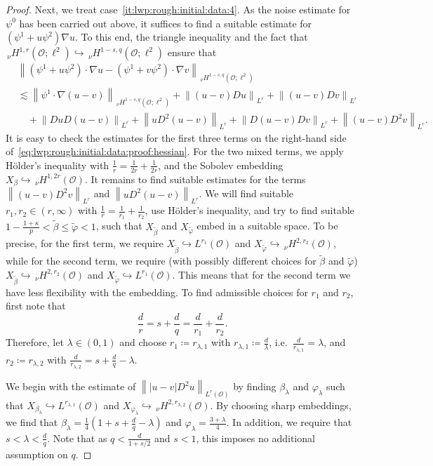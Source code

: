 \documentclass[reqno]{amsart}
\newcommand{\sO}{\mathscr{O}}
\newcommand{\ce}{\coloneqq}
\newcommand{\1}{\mathbf{1}}
\newcommand{\nH}{\ensuremath{\,_\nu H}}
\newcommand{\bpsn}[1]{\ensuremath{\nH^{#1}(\sO)}}
\newcommand{\Bpsn}[1]{\ensuremath{\nH^{#1}(\sO;\ell^2)}}
\newcommand{\nrm}[1]{\left\lVert #1 \right\rVert}
\begin{document}
\begin{proof}
        Next, we treat case~\ref{it:lwp:rough:initial:data:4}. As the noise estimate for $\psi^0$ has been carried out above, it suffices to find a suitable estimate for $(\psi^1+ u\psi^2)\nabla u$. 
        To this end, the triangle inequality and the fact that $\Bpsn{1,r}\hookrightarrow \Bpsn{1-s,q}$ ensure that \begin{equation}\label{eq:lwp:rough:initial:data:proof:hessian}        \begin{aligned}
            &\nrm{(\psi^1+ u\psi^2)\cdot\nabla u-(\psi^1+v\psi^2)\cdot\nabla v}_{\Bpsn{1-s,q}}\\
            &\lesssim \nrm{\psi^1\cdot\nabla(u-v)}_{\Bpsn{1-s,q}} +\nrm{(u-v)Du}_{L^r} +\nrm{(u-v) Dv}_{L^r} \\
            &\quad + \nrm{Du D(u-v)}_{L^r} +\nrm{u D^2(u-v)}_{L^r}+ \nrm{D(u-v)Dv}_{L^r} +\nrm{(u-v)D^2 v}_{L^r}.
        \end{aligned} 
        \end{equation}
        It is easy to check the estimates for the first three terms on the right-hand side of~\eqref{eq:lwp:rough:initial:data:proof:hessian}. For the two mixed terms, we apply Hölder's inequality with $\frac{1}{r}=\frac{1}{2r}+\frac{1}{2r}$, and the Sobolev embedding $X_\beta\hookrightarrow \bpsn{1,2r}$. It remains to find suitable estimates for the terms $\nrm{(u-v)D^2v}_{L^r}$ and $\nrm{u D^2(u-v)}_{L^r}$.
         We will find suitable $r_1,r_2 \in (r,\infty)$ with $\frac{1}{r}=\frac{1}{r_1}+\frac{1}{r_2}$, use Hölder's inequality, and try to find suitable $1-\frac{1+\kappa}{p}<\tilde\beta\le\tilde\varphi<1$, such that $X_{\tilde\beta}$ and $X_{\tilde\varphi}$ embed in a suitable space. To be precise, for the first term, we require $X_{\tilde\beta} \hookrightarrow L^{r_1}(\sO)$ and $X_{\tilde\varphi}\hookrightarrow \bpsn{2,r_2}$, while for the second term, we require (with possibly different choices for $\tilde\beta$ and $\tilde\varphi$)  $X_{\tilde\beta} \hookrightarrow \bpsn{2,r_2}$ and $X_{\tilde\varphi}\hookrightarrow L^{r_1}(\sO)$. 
         This means that for the second term we have less flexibility with the embedding. 
        To find admissible choices for $r_1$ and $r_2$, first note that 
        $$ \frac{d}{r}=s+\frac{d}{q} =\frac{d}{r_1}+\frac{d}{r_2}.$$
        Therefore, let $\lambda\in (0,1)$ and choose $r_1\ce r_{\lambda,1}$ with $r_{\lambda,1}\ce \frac{d}{\lambda}$, i.e.\ $\frac{d}{r_{\lambda,1}}=\lambda$,  and $r_2\ce r_{\lambda,2}$ with $\frac{d}{r_{\lambda,2}}= s+\frac{d}{q}-\lambda$.

        We begin with the estimate of $\nrm{|u-v| D^2u}_{L^r(\sO)}$ by  finding $\beta_\lambda$ and $\varphi_\lambda$ such that $X_{\beta_\lambda}\hookrightarrow L^{r_{\lambda,1}}(\sO)$ and $X_{\varphi_\lambda}\hookrightarrow \bpsn{2,r_{\lambda,2}}$. 
        By choosing sharp embeddings, we find that $\beta_\lambda=\frac{1}{4}(1+s+\frac{d}{q}-\lambda)$ and $\varphi_\lambda=\frac{3+\lambda}{4}$. In addition, we require that $s<\lambda<\frac{d}{q}$. Note that as $q<\frac{d}{1+s/2}$ and $s<1$, this imposes no additional assumption on $q$.


\end{proof}
\end{document}

